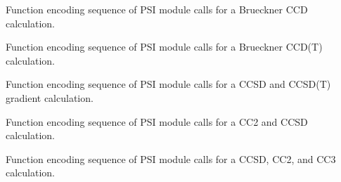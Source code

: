 \documentclass[letterpaper,10pt,english]{sphinxmanual}
\begin{document}

\begin{fulllineitems}
\label{index:proc.run_bccd}
Function encoding sequence of PSI module calls for
a Brueckner CCD calculation.

\end{fulllineitems}


\begin{fulllineitems}
\label{index:proc.run_bccd_t}
Function encoding sequence of PSI module calls for
a Brueckner CCD(T) calculation.

\end{fulllineitems}


\begin{fulllineitems}
\label{index:proc.run_cc_gradient}
Function encoding sequence of PSI module calls for
a CCSD and CCSD(T) gradient calculation.

\end{fulllineitems}


\begin{fulllineitems}
\label{index:proc.run_cc_response}
Function encoding sequence of PSI module calls for
a CC2 and CCSD calculation.

\end{fulllineitems}


\begin{fulllineitems}
\label{index:proc.run_ccenergy}
Function encoding sequence of PSI module calls for
a CCSD, CC2, and CC3 calculation.

\end{fulllineitems}

\end{document}
